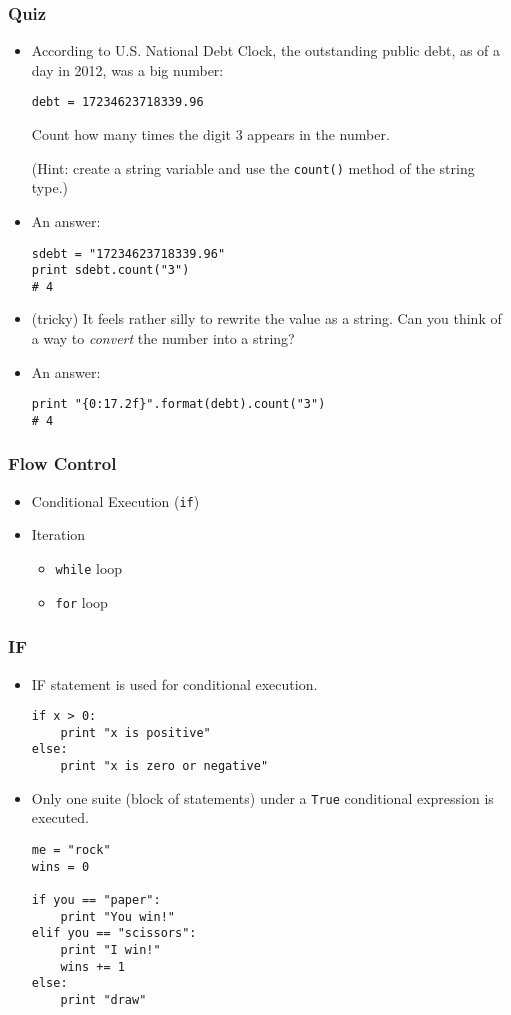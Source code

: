 \documentclass{beamer}
\begin{document}
\begin{frame}[fragile]
\frametitle{Quiz}
\begin{itemize}
\item According to U.S. National Debt Clock,
      the outstanding public debt, as of 
      a day in 2012, was a big number:
\begin{lstlisting}
debt = 17234623718339.96
\end{lstlisting}
      Count how many times the digit 3 appears
      in the number.

      (Hint: create a string variable and use
       the \lstinline{count()} method of
       the string type.)  
\item<2-> An answer:
\begin{lstlisting}
sdebt = "17234623718339.96"
print sdebt.count("3")
# 4
\end{lstlisting}
\item<3-> (tricky) It feels rather silly to rewrite the
          value as a string.
          Can you think of a way to \emph{convert}
          the number into a string? 
\item<3-> An answer:
\begin{lstlisting}
print "{0:17.2f}".format(debt).count("3")
# 4
\end{lstlisting}
\end{itemize}
\end{frame}

\begin{frame}[fragile]
\frametitle{Flow Control}
\begin{itemize}
\item Conditional Execution (\lstinline{if})
\item Iteration
\begin{itemize}
\item \lstinline{while} loop
\item \lstinline{for} loop
\end{itemize}
\end{itemize}
\end{frame}

\begin{frame}[fragile]
\frametitle{IF}
\begin{itemize}
\item IF statement is used for conditional execution.
\begin{lstlisting}
if x > 0:
    print "x is positive"
else:
    print "x is zero or negative" 
\end{lstlisting}
\item Only one suite (block of statements) under a
      \lstinline{True} conditional expression is executed.
\begin{lstlisting}
me = "rock"
wins = 0

if you == "paper":
    print "You win!"
elif you == "scissors":
    print "I win!"
    wins += 1
else:
    print "draw"      
\end{lstlisting}
\end{itemize}
\end{frame}
\end{document}
